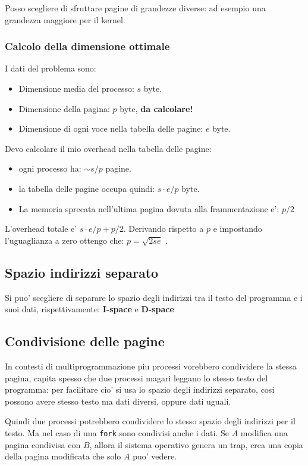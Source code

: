 Posso scegliere di sfruttare pagine di grandezze diverse: ad esempio una grandezza maggiore per il kernel.

\subsubsection{Calcolo della dimensione ottimale}
I dati del problema sono:
\begin{itemize}
    \item Dimensione media del processo: $s$ byte.
    \item Dimensione della pagina: $p$ byte, \textbf{da calcolare!}
    \item Dimensione di ogni voce nella tabella delle pagine: $e$ byte.
\end{itemize}

Devo calcolare il mio overhead nella tabella delle pagine:
\begin{itemize}
    \item ogni processo ha: $\sim s/p$ pagine.
    \item la tabella delle pagine occupa quindi: $s \cdot e /p$ byte.
    \item La memoria sprecata nell'ultima pagina dovuta alla frammentazione e': $p/2$
\end{itemize}

L'overhead totale e' $s \cdot e /p + p/2$. Derivando rispetto a $p$ e impostando l'uguaglianza a zero
ottengo che: $p=\sqrt{2se}$ .

\subsection{Spazio indirizzi separato}
Si puo' scegliere di separare lo spazio degli indirizzi tra il testo del programma e i suoi dati, rispettivamente:
\textbf{I-space} e \textbf{D-space}

\subsection{Condivisione delle pagine}
In contesti di multiprogrammazione piu processi vorebbero condividere la stessa pagina, capita spesso che 
due processi magari leggano lo stesso testo del programma: per facilitare cio' si usa lo spazio degli
indirizzi separato, cosi possono avere stesso testo ma dati diversi, oppure dati uguali.

Quindi due processi potrebbero condividere lo stesso spazio degli indirizzi per il testo. Ma nel caso di una
\texttt{fork} sono condivisi anche i dati. Se $A$ modifica una pagina condivisa con $B$, allora 
il sistema operativo genera un trap, crea una copia della pagina modificata che solo $A$ puo' vedere.

